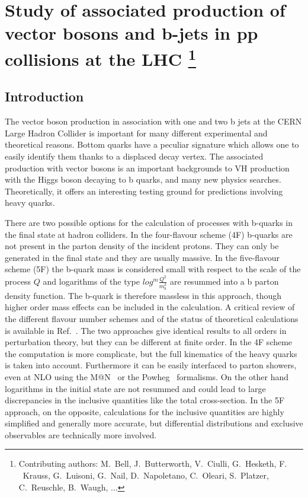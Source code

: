 \documentclass[11pt]{cernrep} \usepackage{graphicx,epsfig} 
\makeatletter
\newcommand{\MCatNLO}{M\protect\scalebox{0.8}{C}@N\protect\scalebox{0.8}{LO}\xspace}
\makeatother
\begin{document}
\section{Study of associated production of vector bosons and b-jets in
  pp collisions at the LHC \protect\footnote{Contributing authors:
    M.~Bell, J.~Butterworth,  V.~Ciulli,
    G.~Hesketh, F. ~Krauss, G.~Luisoni, G.~Nail, D.~Napoletano,
    C.~Oleari, S.~Platzer, C.~Reuschle, B.~Waugh, ... }}

\subsection{Introduction}

The vector boson production in association with one and two b jets at the CERN Large Hadron Collider is important for
many different experimental and theoretical reasons. Bottom quarks have a peculiar signature which allows one to easily
identify them thanks to a displaced decay vertex. The associated production with vector bosons is an important
backgrounds to VH production with the Higgs boson decaying to b quarks, and many new physics searches. Theoretically,
it offers an interesting testing ground for predictions involving heavy quarks. 

There are two possible options for the
calculation of processes with b-quarks in the final state at hadron colliders. In the four-flavour scheme (4F) b-quarks
are not present in the parton density of the incident protons. They can only be generated in the final state and they
are usually massive. In the five-flavour scheme (5F) the b-quark mass is considered small with
respect to the scale of the process $Q$ and logarithms of the type $log^m\frac{Q^2}{m_b^2}$ are resummed into a b parton
density function. The b-quark is therefore massless in this approach, though higher order mass effects
can be included in the calculation. A critical review of the different flavour number schemes and of the
status of theoretical calculations is available in Ref.~\cite{Maltoni:2012pa}. The two approaches give identical results
to all orders in perturbation theory, but they can be different at finite order. In the 4F scheme the computation
is more complicate, but the full kinematics of the heavy quarks is taken into account. Furthermore it can be easily
interfaced to parton showers, even at NLO using the \MCatNLO~\cite{Frixione:2002ik} or the Powheg~\cite{Nason:2004rx} formalisms. 
On the other hand logarithms in the initial state are not resummed and could lead to large discrepancies in the
inclusive quantities like the total cross-section. In the 5F approach, on the opposite, calculations for the inclusive
quantities are highly simplified and generally more accurate, but differential distributions and exclusive observables are
technically more involved. 
\end{document}
